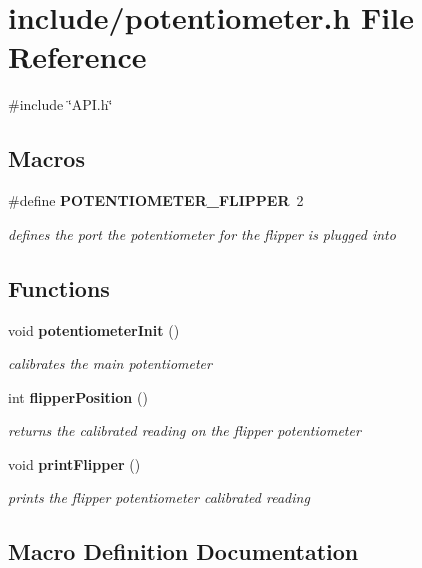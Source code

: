 \section{include/potentiometer.h File Reference}
\label{potentiometer_8h}
{\ttfamily \#include \char`\"{}A\+P\+I.\+h\char`\"{}}\newline
\subsection*{Macros}
\begin{DoxyCompactItemize}
\item 
\#define \textbf{ P\+O\+T\+E\+N\+T\+I\+O\+M\+E\+T\+E\+R\+\_\+\+F\+L\+I\+P\+P\+ER}~2
\begin{DoxyCompactList}\small\item\em defines the port the potentiometer for the flipper is plugged into \end{DoxyCompactList}\end{DoxyCompactItemize}
\subsection*{Functions}
\begin{DoxyCompactItemize}
\item 
void \textbf{ potentiometer\+Init} ()
\begin{DoxyCompactList}\small\item\em calibrates the main potentiometer \end{DoxyCompactList}\item 
int \textbf{ flipper\+Position} ()
\begin{DoxyCompactList}\small\item\em returns the calibrated reading on the flipper potentiometer \end{DoxyCompactList}\item 
void \textbf{ print\+Flipper} ()
\begin{DoxyCompactList}\small\item\em prints the flipper potentiometer calibrated reading \end{DoxyCompactList}\end{DoxyCompactItemize}


\subsection{Macro Definition Documentation}
\mbox{\label{potentiometer_8h_ae42cffaf9c3eb2e1716021e2882f3148}} 
